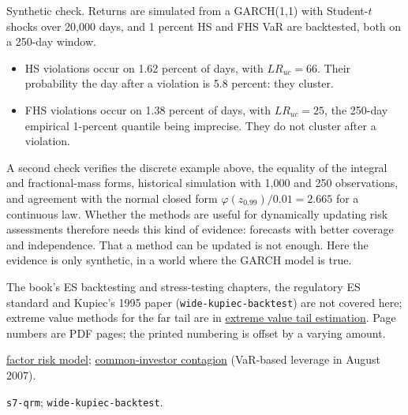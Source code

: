 \begin{qfmethod}
 Synthetic check. Returns are simulated from a GARCH(1,1) with Student-$t$ shocks over 20{,}000 days, and 1 percent HS and FHS VaR are backtested, both on a 250-day window.
\begin{itemize}
\item HS violations occur on 1.62 percent of days, with $LR_{uc}=66$. Their probability the day after a violation is 5.8 percent: they cluster.
\item FHS violations occur on 1.38 percent of days, with $LR_{uc}=25$, the 250-day empirical 1-percent quantile being imprecise. They do not cluster after a violation.
\end{itemize}
A second check verifies the discrete example above, the equality of the integral and fractional-mass forms, historical simulation with 1{,}000 and 250 observations, and agreement with the normal closed form $\varphi(z_{0.99})/0.01=2.665$ for a continuous law. Whether the methods are useful for dynamically updating risk assessments therefore needs this kind of evidence: forecasts with better coverage and independence. That a method can be updated is not enough. Here the evidence is only synthetic, in a world where the GARCH model is true.

 The book's ES backtesting and stress-testing chapters, the regulatory ES standard and Kupiec's 1995 paper (\nolinkurl{wide-kupiec-backtest}) are not covered here; extreme value methods for the far tail are in \hyperref[meth:extreme-value-tail-estimation]{extreme value tail estimation}. Page numbers are PDF pages; the printed numbering is offset by a varying amount.

 \hyperref[mod:factor-risk-model]{factor risk model}; \hyperref[def:common-investor-contagion]{common-investor contagion} (VaR-based leverage in August 2007).

 \nolinkurl{s7-qrm}; \nolinkurl{wide-kupiec-backtest}.

\end{qfmethod}
